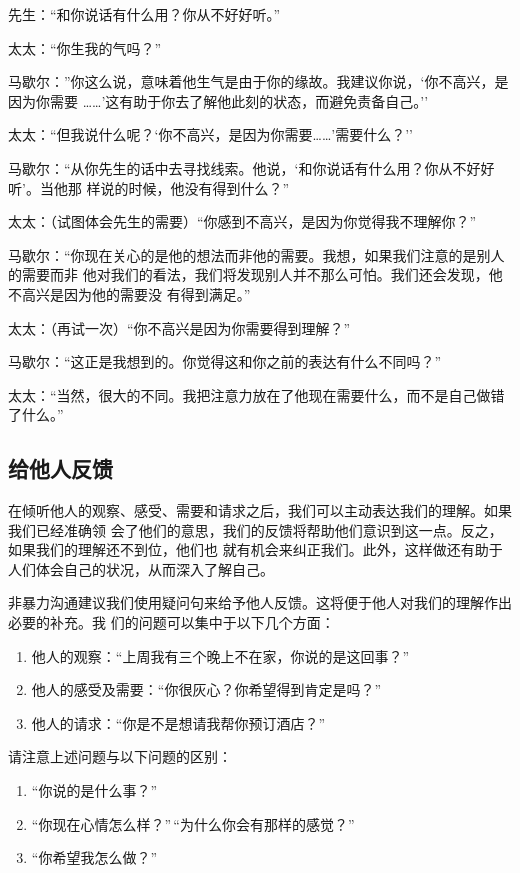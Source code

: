 \documentclass{ctexart}
\renewenvironment{quotation}{\setlength{\parskip}{0.5em}\setstretch{1.5}\kaishu\zihao{-5}\setlength{\parindent}{1em}}{\vspace{1em}}
\begin{document}
\begin{quotation}
	先生：``和你说话有什么用？你从不好好听。''

	太太：``你生我的气吗？''

	马歇尔：''你这么说，意味着他生气是由于你的缘故。我建议你说，`你不高兴，是因为你需要
	\ldots\ldots'这有助于你去了解他此刻的状态，而避免责备自己。''

	太太：``但我说什么呢？`你不高兴，是因为你需要\ldots\ldots'需要什么？''

	马歇尔：``从你先生的话中去寻找线索。他说，`和你说话有什么用？你从不好好听'。当他那
	样说的时候，他没有得到什么？''

	太太：（试图体会先生的需要）``你感到不高兴，是因为你觉得我不理解你？''

	马歇尔：``你现在关心的是他的想法而非他的需要。我想，如果我们注意的是别人的需要而非
	他对我们的看法，我们将发现别人并不那么可怕。我们还会发现，他不高兴是因为他的需要没
	有得到满足。''

	太太：（再试一次）``你不高兴是因为你需要得到理解？''

	马歇尔：``这正是我想到的。你觉得这和你之前的表达有什么不同吗？''

	太太：``当然，很大的不同。我把注意力放在了他现在需要什么，而不是自己做错了什么。''
\end{quotation}


\subsection{给他人反馈}

在倾听他人的观察、感受、需要和请求之后，我们可以主动表达我们的理解。如果我们已经准确领
会了他们的意思，我们的反馈将帮助他们意识到这一点。反之，如果我们的理解还不到位，他们也
就有机会来纠正我们。此外，这样做还有助于人们体会自己的状况，从而深入了解自己。

非暴力沟通建议我们使用疑问句来给予他人反馈。这将便于他人对我们的理解作出必要的补充。我
们的问题可以集中于以下几个方面：

\begin{enumerate}
	\item 他人的观察：``上周我有三个晚上不在家，你说的是这回事？''
	\item 他人的感受及需要：``你很灰心？你希望得到肯定是吗？''
	\item 他人的请求：``你是不是想请我帮你预订酒店？''
\end{enumerate}


请注意上述问题与以下问题的区别：
\begin{enumerate}
	\item ``你说的是什么事？''
	\item ``你现在心情怎么样？''\,``为什么你会有那样的感觉？''
	\item ``你希望我怎么做？''
\end{enumerate}
\end{document}
